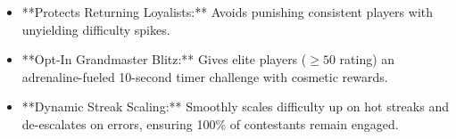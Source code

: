 \begin{tcolorbox}[summarybox, title={Chapter Key Takeaways}]
\begin{itemize}
    \item **Protects Returning Loyalists:** Avoids punishing consistent players with unyielding difficulty spikes.
    \item **Opt-In Grandmaster Blitz:** Gives elite players ($\ge 50$ rating) an adrenaline-fueled 10-second timer challenge with cosmetic rewards.
    \item **Dynamic Streak Scaling:** Smoothly scales difficulty up on hot streaks and de-escalates on errors, ensuring 100\% of contestants remain engaged.
\end{itemize}
\end{tcolorbox}
